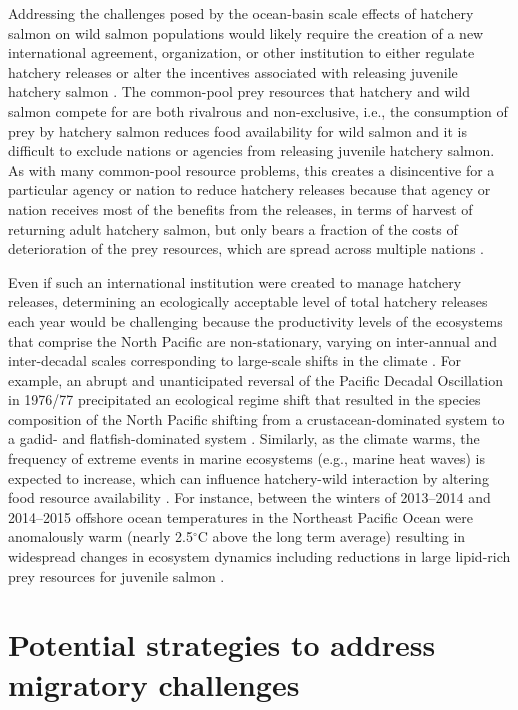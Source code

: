 Addressing the challenges posed by the ocean-basin scale effects of hatchery
salmon on wild salmon populations would likely require the creation of a new
international agreement, organization, or other institution to either regulate
hatchery releases or alter the incentives associated with releasing juvenile
hatchery salmon \citep{Holt2008b}. The common-pool prey resources that hatchery
and wild salmon compete for are both rivalrous and non-exclusive, i.e., the
consumption of prey by hatchery salmon reduces food availability for wild salmon
and it is difficult to exclude nations or agencies from releasing juvenile
hatchery salmon. As with many common-pool resource problems, this creates a
disincentive for a particular agency or nation to reduce hatchery releases
because that agency or nation receives most of the benefits from the releases,
in terms of harvest of returning adult hatchery salmon, but only bears a
fraction of the costs of deterioration of the prey resources, which are spread
across multiple nations \citep{Holt2008b}.

Even if such an international institution were created to manage hatchery
releases, determining an ecologically acceptable level of total hatchery
releases each year would be challenging because the productivity levels of the
ecosystems that comprise the North Pacific are non-stationary, varying on
inter-annual and inter-decadal scales corresponding to large-scale shifts in the
climate \citep{Hare1999a, Chavez2003a}. For example, an abrupt and unanticipated
reversal of the Pacific Decadal Oscillation in 1976/77 precipitated an
ecological regime shift that resulted in the species composition of the North
Pacific shifting from a crustacean-dominated system to a gadid- and
flatfish-dominated system \citep{Mantua1997a, Anderson1999a, Mueter2000a}.
Similarly, as the climate warms, the frequency of extreme events in marine
ecosystems (e.g., marine heat waves) is expected to increase, which can
influence hatchery-wild interaction by altering food resource availability
\citep{Jentsch2007, DiLorenzo2016}. For instance, between the winters of
2013--2014 and 2014--2015 offshore ocean temperatures in the Northeast Pacific
Ocean were anomalously warm (nearly 2.5$^{\circ}$C above the long term average)
resulting in widespread changes in ecosystem dynamics including reductions in
large lipid-rich prey resources for juvenile salmon \citep{Bond2015,
DiLorenzo2016}.



\section{Potential strategies to address migratory challenges}

